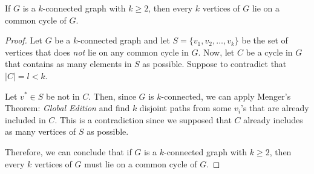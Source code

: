 \begin{theorem}
  If \(G\) is a \(k\)-connected graph with \(k\geq2\), then every
  \(k\) vertices of \(G\) lie on a common cycle of \(G\).
\end{theorem}


\begin{proof}
  Let \(G\) be a \(k\)-connected graph and let \(S = \{v_1, v_2,
  \ldots, v_k\}\) be the set of vertices that does \textit{not}
  lie on any common cycle in \(G\). Now, let \(C\)
  be a cycle in \(G\) that contains as many elements in \(S\) as
  possible. Suppose to contradict that \(|C| = l < k\).

  Let \(v^* \in S\) be not in \(C\). Then, since \(G\) is
  \(k\)-connected, we can apply Menger's Theorem:
  \textit{Global Edition} and find \(k\) disjoint paths from
  some \(v_i\)'s that are already included in \(C\). This is a
  contradiction since we supposed that \(C\) already includes as
  many vertices of \(S\) as possible.

  Therefore, we can conclude that if \(G\) is a \(k\)-connected
  graph with \(k \geq 2\), then every \(k\) vertices of \(G\)
  must lie on a common cycle of \(G\).
\end{proof}


